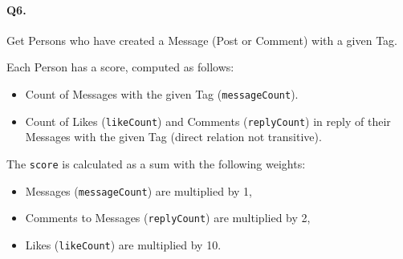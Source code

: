 \paragraph{Q6.}

Get Persons who have created a Message (Post or Comment) with a given
Tag.

Each Person has a score, computed as follows:

\begin{itemize}
\tightlist
\item
  Count of Messages with the given Tag (\texttt{messageCount}).
\item
  Count of Likes (\texttt{likeCount}) and Comments (\texttt{replyCount})
  in reply of their Messages with the given Tag (direct relation not
  transitive).
\end{itemize}

The \texttt{score} is calculated as a sum with the following weights:

\begin{itemize}
\tightlist
\item
  Messages (\texttt{messageCount}) are multiplied by 1,
\item
  Comments to Messages (\texttt{replyCount}) are multiplied by 2,
\item
  Likes (\texttt{likeCount}) are multiplied by 10.
\end{itemize}
